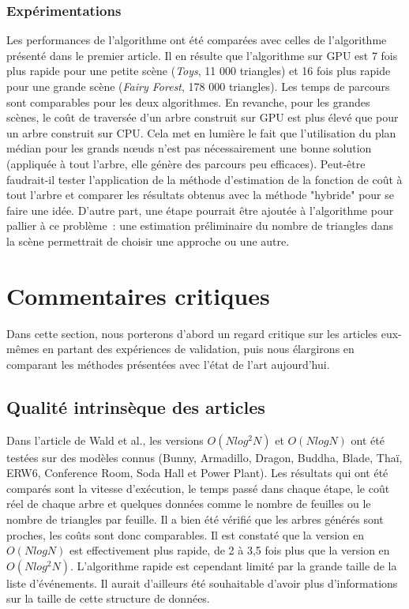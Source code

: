 \documentclass[a4paper]{article}
\begin{document}
\subsubsection{Expérimentations}
Les performances de l'algorithme ont été comparées avec celles de l'algorithme présenté dans le premier article. Il en résulte que l'algorithme sur GPU est 7 fois plus rapide pour une petite scène (\textit{Toys}, 11 000 triangles) et 16 fois plus rapide pour une grande scène (\textit{Fairy Forest}, 178 000 triangles). Les temps de parcours sont comparables pour les deux algorithmes. En revanche, pour les grandes scènes, le coût de traversée d'un arbre construit sur GPU est plus élevé que pour un arbre construit sur CPU. Cela met en lumière le fait que l'utilisation du plan médian pour les grands nœuds n'est pas nécessairement une bonne solution (appliquée à tout l'arbre, elle génère des parcours peu efficaces). Peut-être faudrait-il tester l'application de la méthode d'estimation de la fonction de coût à tout l'arbre et comparer les résultats obtenus avec la méthode "hybride" pour se faire une idée. D'autre part, une étape pourrait être ajoutée à l'algorithme pour pallier à ce problème~: une estimation préliminaire du nombre de triangles dans la scène permettrait de choisir une approche ou une autre.

\section{Commentaires critiques}

Dans cette section, nous porterons d'abord un regard critique sur les articles eux-mêmes en partant des expériences de validation, puis nous élargirons en comparant les méthodes présentées avec l'état de l'art aujourd'hui.

\subsection{Qualité intrinsèque des articles}

Dans l'article de Wald et al., les versions $O(Nlog^2N)$ et $O(NlogN)$ ont été testées sur des modèles connus (Bunny, Armadillo, Dragon, Buddha, Blade, Thaï, ERW6, Conference Room, Soda Hall et Power Plant). Les résultats qui ont été comparés sont la vitesse d'exécution, le temps passé dans chaque étape, le coût réel de chaque arbre et quelques données comme le nombre de feuilles ou le nombre de triangles par feuille. Il a bien été vérifié que les arbres générés sont proches, les coûts sont donc comparables. Il est constaté que la version en $O(NlogN)$ est effectivement plus rapide, de 2 à 3,5 fois plus que la version en $O(Nlog^2N)$. L'algorithme rapide est cependant limité par la grande taille de la liste d'événements. Il aurait d'ailleurs été souhaitable d'avoir plus d'informations sur la taille de cette structure de données.
\end{document}
